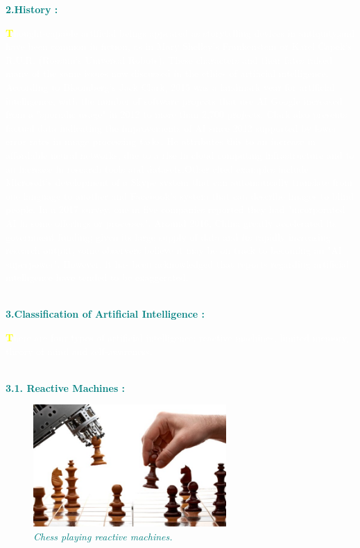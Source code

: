 \documentclass[12pt]{article}
\begin{document}
\begin{large}
\textbf{\textcolor{teal}{2.History :}}\\
\end{large}

\textcolor{white}{\textbf{\textcolor{yellow}{\huge T}}hought-capable artificial beings appeared as storytelling devices in antiquity,and have been common in fiction, as in Mary Shelley's Frankenstein or Karel Čapek's R.U.R. (Rossum's Universal Robots). These characters and their fates raised many of the same issues now discussed in the ethics of artificial intelligence.
According to Bloomberg's Jack Clark, 2015 was a landmark year for artificial intelligence, with the number of software projects that use AI Google increased from a "sporadic usage" in 2012 to more than 2,700 projects. Clark also presents factual data indicating the improvements of AI since 2012 supported by lower error rates in image processing tasks. He attributes this to an increase in affordable neural networks, due to a rise in cloud computing infrastructure and to an increase in research tools and datasets.Other cited examples include Microsoft's development of a Skype system that can automatically translate from one language to another and Facebook's system that can describe images to blind people. In a 2017 survey, one in five companies reported they had "incorporated AI in some offerings or processes". Around 2016, China greatly accelerated its government funding; given its large supply of data and its rapidly increasing research output, some observers believe it may be on track to becoming an "AI superpower". However, it has been acknowledged that reports regarding artificial intelligence have tended to be exaggerated.}\\\\


\begin{large}
\textbf{\textcolor{teal}{3.Classification of Artificial Intelligence :}} \\
\end{large}
\textcolor{white}{\textbf{\textcolor{yellow}{\huge T}}here are four types of artificial intelligence: reactive machines, limited memory, theory of mind and self-awareness.}\\\\


\begin{large}
\textbf{\textcolor{teal}{3.1. Reactive Machines :}}
\end{large}

\begin{figure}
\centering
\includegraphics[width=2.9in]{AI-Paradigm-Need-For-AI-GoodWorkLabs}
\caption{\textit{\textcolor{teal}{Chess playing reactive machines.}}}
\end{figure}
\end{document}
